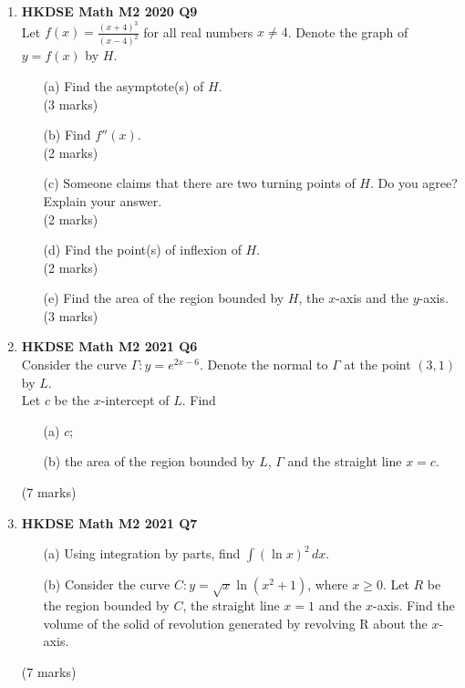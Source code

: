 \documentclass{report}
\begin{document}
\begin{enumerate}
	\item \textbf{HKDSE Math M2 2020 Q9}\\
	Let $\displaystyle f(x) = \frac{(x+4)^3}{(x-4)^2}$ for all real numbers $x \neq 4$. Denote the graph of $y = f(x)$ by $H$.
	\begin{enumerate}
		\item [(a)] Find the asymptote(s) of $H$. \\(3 marks)
		\item [(b)] Find $f''(x)$. \\(2 marks)
		\item [(c)] Someone claims that there are two turning points of $H$. Do you agree? Explain your answer. \\(2 marks)
		\item [(d)] Find the point(s) of inflexion of $H$. \\(2 marks)
		\item [(e)] Find the area of the region bounded by $H$, the $x$-axis and the $y$-axis. \\(3 marks)
	\end{enumerate}

	\item \textbf{HKDSE Math M2 2021 Q6}\\
	Consider the curve $\Gamma : y = e^{2x-6}$. Denote the normal to $\Gamma$ at the point $(3,1)$ by $L$. \\
	Let $c$ be the $x$-intercept of $L$. Find
	\begin{enumerate}
		\item [(a)]$c$;
		\item [(b)]the area of the region bounded by $L$, $\Gamma$ and the straight line $x=c$.
	\end{enumerate}
	(7 marks)

	\newpage

	\item \textbf{HKDSE Math M2 2021 Q7}
	\begin{enumerate}
		\item [(a)]Using integration by parts, find $\displaystyle\int (\ln{x})^2 \,dx$.
		\item [(b)] Consider the curve $\displaystyle C : y = \sqrt{x}\ln{(x^2+1)}$, where $x\geq 0$. Let $R$ be the region bounded by $C$, the straight line $x=1 $ and the $x$-axis. Find the volume of the solid of revolution generated by revolving R about the $x$-axis.
	\end{enumerate}
	(7 marks)


\end{enumerate}
\end{document}
